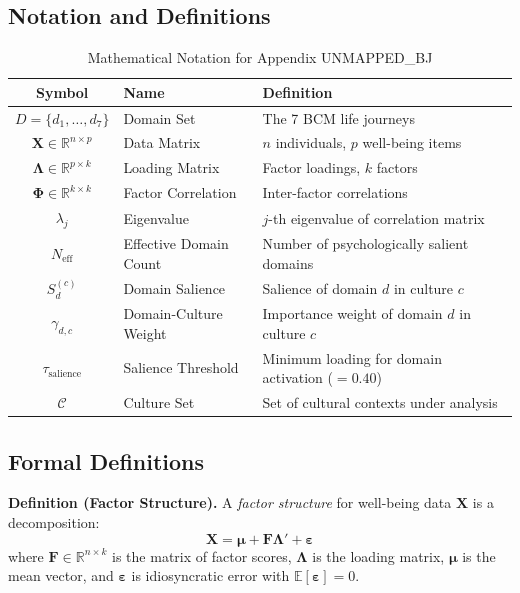 \subsection{Notation and Definitions}

\begin{table}[htbp]
\centering
\caption{Mathematical Notation for Appendix UNMAPPED_BJ}
\label{tab:bj-notation}
\renewcommand{\arraystretch}{1.3}
\small
\begin{tabular}{@{}clp{6cm}@{}}
\toprule
\textbf{Symbol} & \textbf{Name} & \textbf{Definition} \\
\midrule
$D = \{d_1, \ldots, d_7\}$ & Domain Set & The 7 BCM life journeys \\
$\mathbf{X} \in \mathbb{R}^{n \times p}$ & Data Matrix & $n$ individuals, $p$ well-being items \\
$\boldsymbol{\Lambda} \in \mathbb{R}^{p \times k}$ & Loading Matrix & Factor loadings, $k$ factors \\
$\boldsymbol{\Phi} \in \mathbb{R}^{k \times k}$ & Factor Correlation & Inter-factor correlations \\
$\lambda_j$ & Eigenvalue & $j$-th eigenvalue of correlation matrix \\
$N_{\text{eff}}$ & Effective Domain Count & Number of psychologically salient domains \\
$S_d^{(c)}$ & Domain Salience & Salience of domain $d$ in culture $c$ \\
$\gamma_{d,c}$ & Domain-Culture Weight & Importance weight of domain $d$ in culture $c$ \\
$\tau_{\text{salience}}$ & Salience Threshold & Minimum loading for domain activation ($= 0.40$) \\
$\mathcal{C}$ & Culture Set & Set of cultural contexts under analysis \\
\bottomrule
\end{tabular}
\end{table}

\subsection{Formal Definitions}

\begin{tcolorbox}[colback=gray!5!white, colframe=gray!75!black, title=Definition BJ-D1: Factor Structure]
\textbf{Definition (Factor Structure).}
A \textit{factor structure} for well-being data $\mathbf{X}$ is a decomposition:
\begin{equation}
\mathbf{X} = \boldsymbol{\mu} + \mathbf{F} \boldsymbol{\Lambda}' + \boldsymbol{\varepsilon}
\label{eq:bj-factor-model}
\end{equation}
where $\mathbf{F} \in \mathbb{R}^{n \times k}$ is the matrix of factor scores, $\boldsymbol{\Lambda}$ is the loading matrix,
$\boldsymbol{\mu}$ is the mean vector, and $\boldsymbol{\varepsilon}$ is idiosyncratic error with $\mathbb{E}[\boldsymbol{\varepsilon}] = 0$.
\end{tcolorbox}

